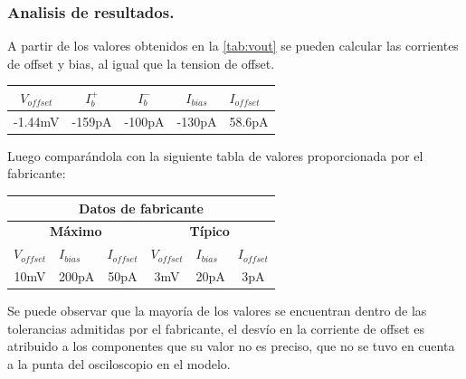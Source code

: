 \subsubsection{Analisis de resultados.}
A partir de los valores obtenidos en la   \ref{tab:vout} se pueden calcular las corrientes de offset y bias, al igual que la tension de offset.
\begin{table}[H]
\begin{center}
\begin{tabular}{|c|c|c|c|l|}
\hline
\textbf{$V_{offset}$} & \textbf{$I_b^+$} & \textbf{$I_b^-$} & \textbf{$I_{bias}$} & \textbf{$I_{offset}$} \\ \hline
-1.44mV & -159pA & -100pA & -130pA & 58.6pA \\ \hline
\end{tabular}
\end{center}
\end{table}
Luego comparándola con la siguiente tabla de valores proporcionada por el fabricante:
\begin{table}[H]
\begin{center}
\begin{tabular}{|c|l|l|c|l|l|}
\hline
\multicolumn{6}{|c|}{\textbf{Datos de fabricante}}                                                                                                                                                       \\ \hline
\multicolumn{3}{|c|}{\textbf{Máximo}}                                                                & \multicolumn{3}{c|}{\textbf{Típico}}                                                              \\ \hline
\multicolumn{1}{|l|}{\textbf{$V_{offset}$}} & \textbf{$I_{bias}$}        & \textbf{$I_{offset}$}     & \multicolumn{1}{l|}{\textbf{$V_{offset}$}} & \textbf{$I_{bias}$}       & \textbf{$I_{offset}$}    \\ \hline
10mV                                        & \multicolumn{1}{c|}{200pA} & \multicolumn{1}{c|}{50pA} & 3mV                                        & \multicolumn{1}{c|}{20pA} & \multicolumn{1}{c|}{3pA} \\ \hline
\end{tabular}
\end{center}
\end{table}
Se puede observar que la mayoría de los valores se encuentran dentro de las tolerancias admitidas por el fabricante, el desvío en la corriente de offset es atribuido a los componentes que su valor no es preciso, que no se tuvo en cuenta a la punta del osciloscopio en el modelo.
